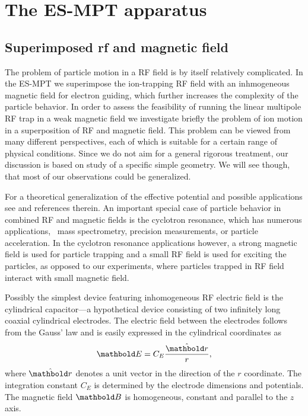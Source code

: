 
\chapter{The ES-MPT apparatus}

\label{ch:ESMPT}

\section{Superimposed rf and magnetic field}
The problem of particle motion in a \ac{RF} field is by itself
relatively complicated. In the \ac{ES-MPT} we superimpose
the ion-trapping \ac{RF} field with an inhmogeneous magnetic
field for electron guiding, which further increases the complexity
of the particle behavior. In order to assess the feasibility of
running the linear multipole \ac{RF} trap in a weak magnetic field
we investigate briefly the problem of ion motion in a superposition
of \ac{RF} and magnetic field. This problem can be viewed from
many different perspectives, each of which is suitable for
a certain range of physical conditions. Since we do not aim for a
general rigorous treatment, our discussion is based on study
of a specific simple geometry. We will see though, that most
of our observations could be generalized.

For a theoretical generalization of the effective potential
and possible applications see \cite{dodin2006,dodin2005}
and references therein. An important special case of particle
behavior in combined \ac{RF} and magnetic fields is the
cyclotron resonance, which has numerous applications, \eg\ 
mass spectrometry, precision measurements, or particle acceleration.
In the cyclotron resonance applications however, a strong magnetic field
is used for particle trapping and a small \ac{RF} field is used for
exciting the particles, as opposed to our experiments, where particles
trapped in \ac{RF} field interact with small magnetic field.

Possibly the simplest device featuring inhomogeneous RF electric
field is the cylindrical capacitor---a hypothetical device
consisting of two infinitely long coaxial cylindrical electrodes.
The electric field between the electrodes follows from the Gauss' law
and is easily expressed in the cylindrical coordinates as
\begin{equation}
\mb E = C_E\frac{\hat {\mb r}}{r},
\label{eq:esmpt:magnetronfield}
\end{equation}
where $\hat{\mb r}$ denotes a unit vector in the direction of the $r$
coordinate. The integration constant $C_E$ is determined by the
electrode dimensions and potentials. The magnetic field $\mb B$ is
homogeneous, constant and parallel to the $z$ axis.

